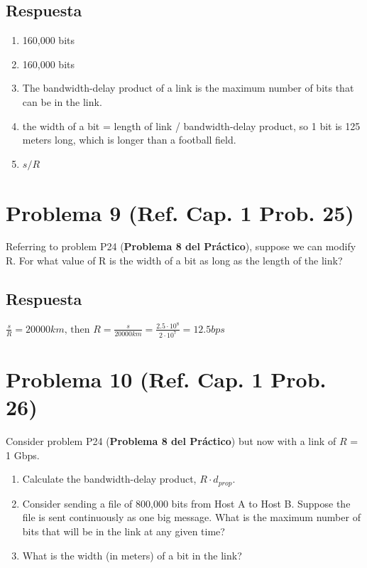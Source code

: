 \documentclass[10pt,spanish]{article}
\numberwithin{figure}{section} %
\begin{document}
\subsection*{Respuesta}

\begin{enumerate}
\item 160,000 bits
\item 160,000 bits
\item The bandwidth-delay product of a link is the maximum number of bits that can be in the link.
\item the width of a bit = length of link / bandwidth-delay product, so 1 bit is 125 meters long, which is longer than a football field.
\item $s/R$

\end{enumerate}

\section[Problema 9]{Problema 9 \textnormal{\Large{(Ref. Cap. 1 Prob. 25)}}}

Referring to problem P24 (\textbf{Problema 8 del Práctico}), suppose we can modify R. For what value of R is the width of a bit as long as the length of the link?

\subsection*{Respuesta}

$\displaystyle \frac{s}{R} = 20000km \text{, then } R = \frac{s}{20000km} = \frac{2.5 \cdot 10^8}{2 \cdot 10^7}= 12.5 bps$

\section[Problema 10]{Problema 10 \textnormal{\Large{(Ref. Cap. 1 Prob. 26)}}}

Consider problem P24 (\textbf{Problema 8 del Práctico}) but now with a link of $R$ = 1 Gbps.
\begin{enumerate}
\item Calculate the bandwidth-delay product, $R \cdot d_{prop}$.
\item Consider sending a file of 800,000 bits from Host A to Host B. Suppose the file is sent continuously as one big message. What is the maximum number of bits that will be in the link at any given time?
\item What is the width (in meters) of a bit in the link?
\end{enumerate}
\end{document}
